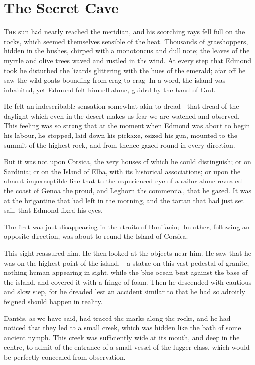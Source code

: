 \chapter{The Secret Cave} 

 \lettrine{T}{he} sun had nearly reached the meridian, and his scorching rays fell full on the rocks, which seemed themselves sensible of the heat. Thousands of grasshoppers, hidden in the bushes, chirped with a monotonous and dull note; the leaves of the myrtle and olive trees waved and rustled in the wind. At every step that Edmond took he disturbed the lizards glittering with the hues of the emerald; afar off he saw the wild goats bounding from crag to crag. In a word, the island was inhabited, yet Edmond felt himself alone, guided by the hand of God. 

 He felt an indescribable sensation somewhat akin to dread—that dread of the daylight which even in the desert makes us fear we are watched and observed. This feeling was so strong that at the moment when Edmond was about to begin his labour, he stopped, laid down his pickaxe, seized his gun, mounted to the summit of the highest rock, and from thence gazed round in every direction. 

 But it was not upon Corsica, the very houses of which he could distinguish; or on Sardinia; or on the Island of Elba, with its historical associations; or upon the almost imperceptible line that to the experienced eye of a sailor alone revealed the coast of Genoa the proud, and Leghorn the commercial, that he gazed. It was at the brigantine that had left in the morning, and the tartan that had just set sail, that Edmond fixed his eyes. 

 The first was just disappearing in the straits of Bonifacio; the other, following an opposite direction, was about to round the Island of Corsica. 

 This sight reassured him. He then looked at the objects near him. He saw that he was on the highest point of the island,—a statue on this vast pedestal of granite, nothing human appearing in sight, while the blue ocean beat against the base of the island, and covered it with a fringe of foam. Then he descended with cautious and slow step, for he dreaded lest an accident similar to that he had so adroitly feigned should happen in reality. 

 Dantès, as we have said, had traced the marks along the rocks, and he had noticed that they led to a small creek, which was hidden like the bath of some ancient nymph. This creek was sufficiently wide at its mouth, and deep in the centre, to admit of the entrance of a small vessel of the lugger class, which would be perfectly concealed from observation. 

